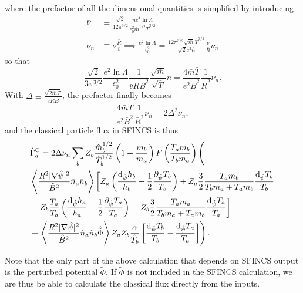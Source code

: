 \documentclass[12pt, a4paper]{article}
\newcommand{\p}{\ensuremath{\partial}}
\renewcommand{\d}{\ensuremath{\mathrm{d}}}
\newcommand{\lang}{\left\langle}
\newcommand{\rang}{\right\rangle}
\begin{document}
where the prefactor of all the dimensional quantities is simplified by introducing
\begin{align}
  \bar{\nu} &\equiv \frac{\sqrt{2}}{12 \pi^{3/2}} \frac{\bar{n} e^4 \ln \Lambda}{\epsilon_0^2 \bar{m}^{1/2} \bar{T}^{3/2}}  \\
  \nu_n &\equiv \bar{\nu} \frac{\bar{R}}{\bar{v}} \implies \frac{e^2 \ln \Lambda}{\epsilon_0^2} = \frac{12 \pi^{3/2} \sqrt{\bar{m}} \bar{T}^{3/2}}{\sqrt{2} e^2 \bar{n}}\frac{\bar{v}}{\bar{R}} \nu_n
\end{align}
so that
\begin{equation}
  \frac{\sqrt{2}}{3\pi^{3/2}}\frac{ e^2 \ln \Lambda}{\epsilon_0^2 } \frac{1}{\bar{v} \bar{R} \bar{B}^2} \frac{\sqrt{\bar{m}}}{\sqrt{\bar{T}}} \bar{n}  =
  \frac{4\bar{m} \bar{T}}{e^2 \bar{B}^2}\frac{1}{\bar{R}^2} \nu_n.
\end{equation}
With $\Delta \equiv \frac{\sqrt{2\bar{m}\bar{T}}}{e\bar{R}\bar{B}}$, the prefactor finally becomes
  \begin{equation}
\frac{4\bar{m} \bar{T}}{e^2 \bar{B}^2}\frac{1}{\bar{R}^2} \nu_n = 2 \Delta^2 \nu_n,
\end{equation}
and the classical particle flux in SFINCS is thus
\begin{equation}
  \begin{aligned}
    &\hat{\Gamma}_a^{\text{C}}  
    =  2 \Delta \nu_n
    \sum_b Z_b \frac{\hat{m}_b^{1/2}}{\hat{T}_b^{1/2}} \left(1 + \frac{m_b}{m_a} \right) F\left(\frac{T_a m_b}{T_b m_a}\right) \left( \vphantom{ \lang \frac{\bar{R}^2|\nabla \hat{\psi}|^2}{\hat{B}^2} \hat{n}_a \hat{n}_b \rang}\right.\\
      &  \lang \frac{\bar{R}^2|\nabla \hat{\psi}|^2}{\hat{B}^2} \hat{n}_a \hat{n}_b \rang \left[Z_a     \left(\frac{\d_{\hat{\psi}} h_b}{h_b}  - \frac{1}{2} \frac{\p_{\hat{\psi}} T_b}{T_b}\right) 
      + Z_a  \frac{3}{2} \frac{T_a m_b}{T_b m_a + T_a m_b} \frac{\d_{\hat{\psi}} T_b}{T_b}\right. \\
      & - Z_b  \frac{T_a}{T_b}\left(\frac{\d_{\hat{\psi}} h_a}{h_a}  - \frac{1}{2} \frac{\p_{\hat{\psi}} T_a}{T_a}\right) 
      - \left.Z_b \frac{3}{2} \frac{T_a m_a}{T_b m_a + T_a m_b}  \frac{\d_{\hat{\psi}} T_a}{T_a} \right] \\
      & +\left. \lang \frac{\bar{R}^2|\nabla \hat{\psi}|^2}{\hat{B}^2} \hat{n}_a \hat{n}_b \hat{\tilde{\Phi}}\rang Z_a Z_b \frac{\alpha}{\hat{T_b}} \left[ \frac{\d_{\hat{\psi}} T_b}{T_b} - \frac{\d_{\hat{\psi}} T_a}{T_a} \right]\right).
\end{aligned} \label{eq:fluxgS2}
\end{equation}

Note that the only part of the above calculation that depends on SFINCS output is the perturbed potential $\tilde{\Phi}$. If $\tilde{\Phi}$ is not included in the SFINCS calculation, we are thus be able to calculate the classical flux directly from the inputs.
\end{document}
